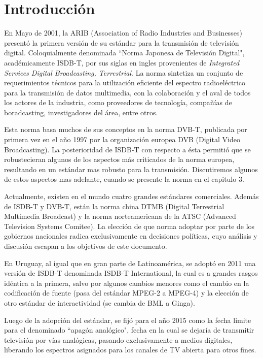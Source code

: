 \chapter{Introducción}

En Mayo de 2001, la ARIB (Association of Radio Industries and Businesses)\cite{ARIB} presentó la primera versión de su estándar para la transmisión de televisión digital. Coloquialmente denominada ``Norma Japonesa de Televisión Digital", académicamente ISDB-T, por sus siglas en ingles provenientes de \textit{Integrated Services Digital Broadcasting, Terrestrial}. La norma sintetiza un conjunto de requerimientos técnicos para la utilización eficiente del espectro radioeléctrico para la transmisión de datos multimedia, con la colaboración y el aval de todos los actores de la industria, como proveedores de tecnología, compañías de boradcasting, investigadores del área, entre otros.

Esta norma basa muchos de sus conceptos en la norma DVB-T, publicada por primera vez en el año 1997 por la organización europea DVB (Digital Video Broadcasting). La posterioridad de ISDB-T con respecto a ésta permitió que se robustecieran algunos de los aspectos más criticados de la norma europea, resultando en un estándar mas robusto para la transmisión. Discutiremos algunos de estos aspectos mas adelante, cuando se presente la norma en el capitulo 3.

Actualmente, existen en el mundo cuatro grandes estándares comerciales. Además de ISDB-T y DVB-T, están la norma china DTMB (Digital Terrestrial Multimedia Broadcast) y la norma norteamericana de la ATSC (Advanced Television Systems Comitee). La elección de que norma adoptar por parte de los gobiernos nacionales radica exclusivamente en decisiones políticas, cuyo análisis y discusión escapan a los objetivos de este documento.

En Uruguay, al igual que en gran parte de Latinoamérica, se adoptó en 2011 una versión de ISDB-T denominada ISDB-T International, la cual es a grandes rasgos idéntica a la primera, salvo por algunos cambios menores como el cambio en la codificación de fuente (pasa del estándar MPEG-2 a MPEG-4) y la elección de otro estándar de interactividad (se cambia de BML a Ginga).

Luego de la adopción del estándar, se fijó para el año 2015 como la fecha limite para el denominado ``apagón analógico", fecha en la cual se dejaría de transmitir televisión por vías analógicas, pasando exclusivamente a medios digitales, liberando los espectros asignados para los canales de TV abierta para otros fines. 

